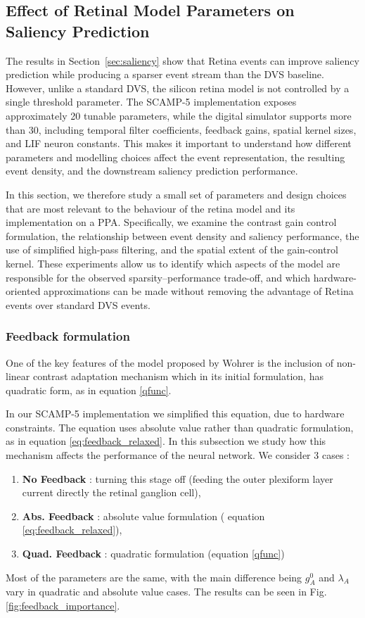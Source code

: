 \documentclass{article}
\begin{document}
\subsection{Effect of Retinal Model Parameters on Saliency Prediction}
\label{sec:ablation}

The results in Section~\ref{sec:saliency} show that Retina events can improve saliency prediction while producing a sparser event stream than the DVS baseline. However, unlike a standard DVS, the silicon retina model is not controlled by a single threshold parameter. The SCAMP-5 implementation exposes approximately 20 tunable parameters, while the digital simulator supports more than 30, including temporal filter coefficients, feedback gains, spatial kernel sizes, and LIF neuron constants. This makes it important to understand how different parameters and modelling choices affect the event representation, the resulting event density, and the downstream saliency prediction performance.

In this section, we therefore study a small set of parameters and design choices that are most relevant to the behaviour of the retina model and its implementation on a PPA. Specifically, we examine the contrast gain control formulation, the relationship between event density and saliency performance, the use of simplified high-pass filtering, and the spatial extent of the gain-control kernel. These experiments allow us to identify which aspects of the model are responsible for the observed sparsity--performance trade-off, and which hardware-oriented approximations can be made without removing the advantage of Retina events over standard DVS events.

\subsubsection{Feedback formulation}
One of the key features of the model proposed by Wohrer \cite{wohrer_virtual_2009} is the inclusion of non-linear contrast adaptation mechanism which in its initial formulation, has quadratic form, as in equation \ref{qfunc}. 

In our SCAMP-5 implementation we simplified this equation, due to hardware constraints. The equation uses absolute value rather than quadratic formulation, as in equation \ref{eq:feedback_relaxed}. In this subsection we study how this mechanism affects the performance of the neural network. We consider 3 cases : 
\begin{enumerate}
    \item \textbf{No Feedback} : turning this stage off (feeding the outer plexiform layer current directly the retinal ganglion cell),
    \item \textbf{Abs. Feedback} : absolute value formulation ( equation \ref{eq:feedback_relaxed}),
    \item \textbf{Quad. Feedback} : quadratic formulation (equation \ref{qfunc})
\end{enumerate}
Most of the parameters are the same, with the main difference being $g_{A}^0$ and $\lambda_{A}$ vary in quadratic and absolute value cases. The results can be seen in Fig. \ref{fig:feedback_importance}.
\end{document}
